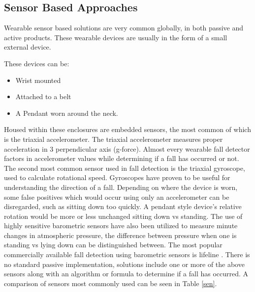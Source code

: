 \vspace{3cm}
\subsection{Sensor Based Approaches}
Wearable sensor based solutions are very common globally, in both passive and active products. These wearable devices are usually in the form of a small external device.

These devices can be:
\begin{itemize}
\item Wrist mounted
\item Attached to a belt
\item A Pendant worn around the neck.
\end{itemize}

Housed within these enclosures are embedded sensors, the most common of which is the triaxial accelerometer. The triaxial accelerometer measures proper acceleration in 3 perpendicular axis (g-force). Almost every wearable fall detector factors in accelerometer values while determining if a fall has occurred or not. The second most common sensor used in fall detection is the triaxial gyroscope, used to calculate rotational speed. Gyroscopes have proven to be useful for understanding the direction of a fall. Depending on where the device is worn, some false positives which would occur using only an accelerometer can be disregarded, such as sitting down too quickly. A pendant style device’s relative rotation would be more or less unchanged sitting down vs standing. The use of highly sensitive barometric sensors have also been utilized to measure minute changes in atmospheric pressure, the difference between pressure when one is standing vs lying down can be distinguished between. The most popular commercially available fall detection using barometric sensors is lifeline \cite{lifeline}. There is no standard passive implementation, solutions include one or more of the above sensors along with an algorithm or formula to determine if a fall has occurred. A comparison of sensors most commonly used can be seen in Table \ref{sen}.

